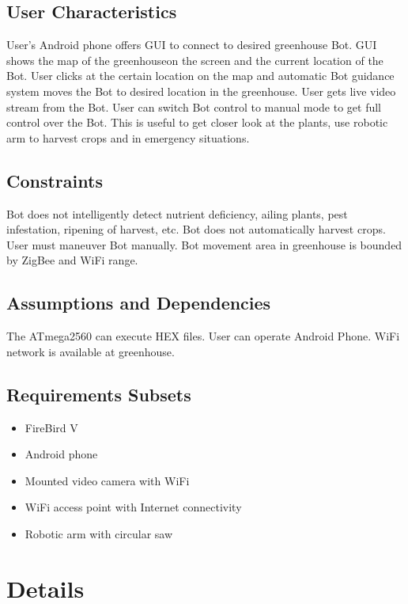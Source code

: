 \documentclass[a4paper, 12pt]{article}
\begin{document}
\subsection{User Characteristics}
User's Android phone offers GUI to connect to desired greenhouse Bot. GUI shows the map of the greenhouseon
the screen and the current location of the Bot. User clicks at the certain location on the map
and automatic Bot guidance system moves the Bot to desired location in the greenhouse. User gets live video stream
from the Bot. User can switch Bot control to manual mode to get full control over the Bot. This is useful to get 
closer look at the plants, use robotic arm to harvest crops and in emergency situations.

\subsection{Constraints}
Bot does not intelligently detect nutrient deficiency, ailing plants, pest infestation, ripening of harvest, etc.
Bot does not automatically harvest crops. User must maneuver Bot manually.
Bot movement area in greenhouse is bounded by ZigBee and WiFi range.

\subsection{Assumptions and Dependencies}
The ATmega2560 can execute HEX files. User can operate Android Phone. WiFi network is available at greenhouse.

\subsection{Requirements Subsets}
\begin{itemize}
 \item FireBird V
 \item Android phone
 \item Mounted video camera with WiFi
 \item WiFi access point with Internet connectivity
 \item Robotic arm with circular saw
\end{itemize}

\section{Details}
\end{document}
